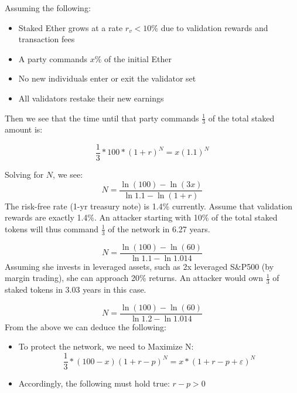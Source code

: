 \documentclass{article}
\renewcommand{\|}{\;|\;}
\begin{document}
Assuming the following: 
\begin{itemize}
\item Staked Ether grows at a rate $r_{v} < 10\%$ due to validation rewards and transaction fees
\item A party commands $x\%$ of the initial Ether
\item No new individuals enter or exit the validator set
\item All validators restake their new earnings
\end{itemize}
Then we see that the time until that party commands $\frac{1}{3}$ of the total staked amount is:

\begin{equation}
\frac{1}{3} * 100 * (1 + r)^N  = x(1.1)^N
\end{equation}

Solving for $N$,  we see:
\begin{equation}
N = \frac{\ln{(100)}- \ln{(3x)}}{ \ln{1.1} - \ln{(1+r)}}
\end{equation} \newline The risk-free rate (1-yr treasury note) is 1.4\% currently. Assume that validation rewards are exactly 1.4\%. An attacker starting with 10\% of the total staked tokens will thus command $\frac{1}{3}$ of the network in 6.27 years.

\begin{equation}
    N =  \frac{\ln{(100)} - \ln{(60)}}{\ln{1.1}- \ln{1.014}}
\end{equation} \newline Assuming she invests in leveraged assets, such as 2x leveraged S&P500 (by margin trading), she can approach 20\% returns. An attacker would own $\frac{1}{3}$ of staked tokens in 3.03 years in this case.

\begin{equation}
    N =  \frac{\ln{(100)} - \ln{(60)}}{\ln{1.2}- \ln{1.014}}
\end{equation} \newline From the above we can deduce the following:
\begin{itemize}
  \item To protect the network, we need to Maximize N:
    \begin{equation}
    \frac{1}{3} * (100 - x)(1 + r - p)^N  = x * (1 + r - p + \varepsilon)^N
    \end{equation}
  \item Accordingly, the following must hold true: 
        $r - p > 0$
\end{itemize}
\end{document}
